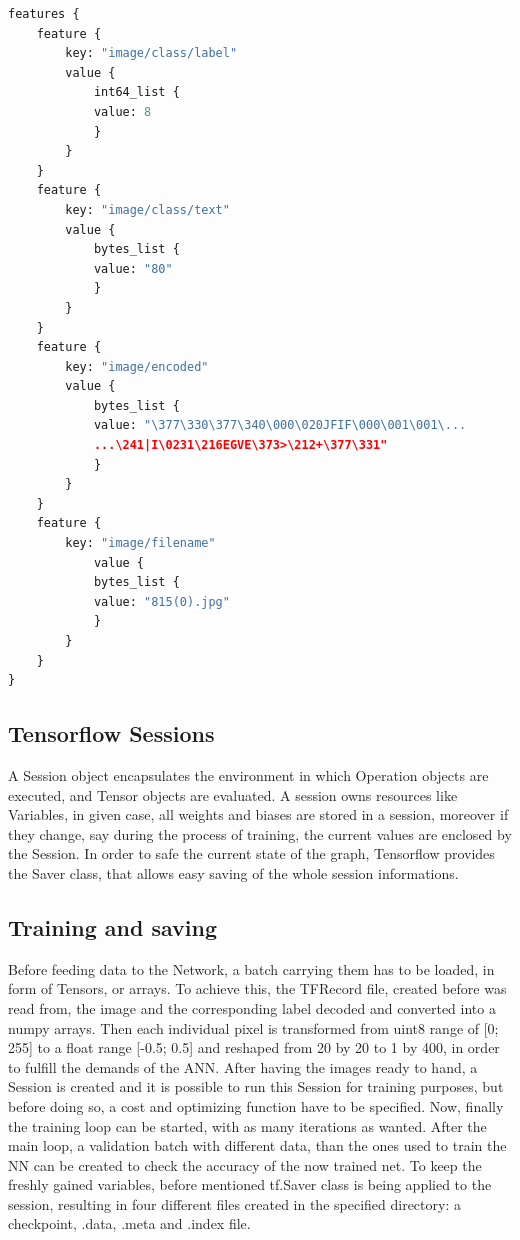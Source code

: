 \begin{minipage}{\linewidth}
\begin{lstlisting}[language=python, caption={Minimized Excerpt of a  TFRecord file}, label={lst:tfrecord},captionpos=b]
features {
	feature {
		key: "image/class/label"
		value {
			int64_list {
			value: 8
			}
		}
	}
	feature {
		key: "image/class/text"
		value {
			bytes_list {
			value: "80"
			}
		}
	}
	feature {
		key: "image/encoded"
		value {
			bytes_list {
			value: "\377\330\377\340\000\020JFIF\000\001\001\...
			...\241|I\0231\216EGVE\373>\212+\377\331"
			}
		}
	}
	feature {
		key: "image/filename"
			value {
			bytes_list {
			value: "815(0).jpg"
			}
		}
	}
}

\end{lstlisting}
\end{minipage}

\subsection{Tensorflow Sessions}
A Session object encapsulates the environment in which Operation objects are executed, and Tensor objects are evaluated\cite{tensorflowsession}. A session owns resources like Variables, in given case, all weights and biases are stored in a session, moreover if they change, say during the process of training, the current values are enclosed by the Session. In order to safe the current state of the graph, Tensorflow provides the Saver class, that allows easy saving of the whole session informations. 

\subsection{Training and saving}
Before feeding data to the Network, a batch carrying them has to be loaded, in form of Tensors, or arrays. To achieve this, the TFRecord file, created before was read from, the image and the corresponding label decoded and converted into a numpy arrays. Then each individual pixel is transformed from uint8 range of [0; 255] to a float range [-0.5; 0.5] and reshaped from 20 by 20 to 1 by 400, in order to fulfill the demands of the ANN. After having the images ready to hand, a Session is created and it is possible to run this Session for training purposes, but before doing so, a cost and optimizing function have to be specified. Now, finally the training loop can be started, with as many iterations as wanted. After the main loop, a validation batch with different data, than the ones used to train the NN can be created to check the accuracy of the now trained net. \newline
To keep the freshly gained variables, before mentioned tf.Saver class is being applied to the session, resulting in four different files created in the specified directory: a checkpoint, .data, .meta and .index file. 
 


